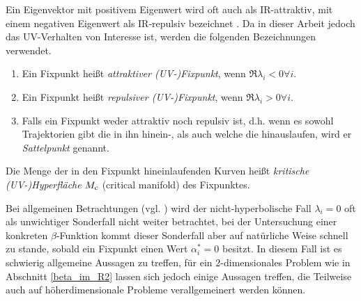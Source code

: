     Ein Eigenvektor mit positivem Eigenwert wird oft auch als IR-attraktiv, mit 
    einem negativen Eigenwert als IR-repulsiv bezeichnet \cite{Weinberg:1976}. 
    Da in dieser Arbeit jedoch das UV-Verhalten von Interesse ist, werden die 
    folgenden Bezeichnungen verwendet.
    \begin{enumerate}
     \item Ein Fixpunkt heißt \textit{attraktiver (UV-)Fixpunkt}, wenn 
     	$\Re \lambda_i<0 \forall i$.
     \item Ein Fixpunkt heißt \textit{repulsiver (UV-)Fixpunkt}, wenn 
	$\Re \lambda_i>0 \forall i$.
     \item Falls ein Fixpunkt weder attraktiv noch repulsiv ist, d.h. wenn es 
     sowohl Trajektorien gibt die in ihn hinein-, als auch welche die 
     hinauslaufen, wird er \textit{Sattelpunkt} genannt.
    \end{enumerate}
     \begin{definition}
      Die Menge der in den Fixpunkt hineinlaufenden Kurven heißt 
      \textit{kritische (UV-)Hyperfläche} $M_\text{c}$ (critical manifold) des 
      Fixpunktes.
    \end{definition}

    Bei allgemeinen Betrachtungen (vgl. \cite{Weinberg:1976}) 
    wird der nicht-hyperbolische Fall $\lambda_i = 0$ oft als unwichtiger 
    Sonderfall nicht weiter betrachtet, bei der Untersuchung einer konkreten 
    $\beta$-Funktion kommt dieser Sonderfall aber auf natürliche Weise schnell 
    zu stande, sobald ein Fixpunkt einen Wert $\alpha^*_i = 0$ besitzt. In diesem 
    Fall ist es schwierig allgemeine Aussagen zu treffen, für ein 2-dimensionales 
    Problem wie in Abschnitt \ref{beta_im_R2} lassen sich jedoch einige 
    Aussagen treffen, die Teilweise auch auf höherdimensionale Probleme 
    verallgemeinert werden können.
    

